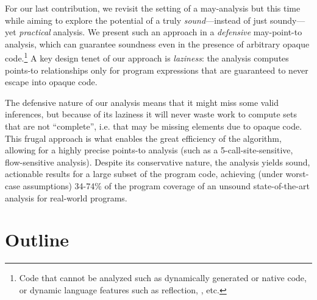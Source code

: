  For our last contribution, we revisit the setting of a may-analysis but this time while aiming to explore the potential of a truly \emph{sound}---instead of just soundy---yet \emph{practical} analysis. We present such an approach in a \emph{defensive} may-point-to analysis, which can guarantee soundness even in the presence of arbitrary opaque code.\footnote{Code that cannot be analyzed such as dynamically generated or native code, or dynamic language features such as reflection, , etc.} A key design tenet of our approach is \emph{laziness}: the analysis computes points-to relationships only for program expressions that are guaranteed to never escape into opaque code.

The defensive nature of our analysis means that it might miss some valid inferences, but because of its laziness it will never waste work to compute sets that are not ``complete'', i.e. that may be missing elements due to opaque code. This frugal approach is what enables the great efficiency of the algorithm, allowing for a highly precise points-to analysis (such as a 5-call-site-sensitive, flow-sensitive analysis). Despite its conservative nature, the analysis yields sound, actionable results for a large subset of the program code, achieving (under worst-case assumptions) 34-74\% of the program coverage of an unsound state-of-the-art analysis for real-world programs.


\section{Outline}


